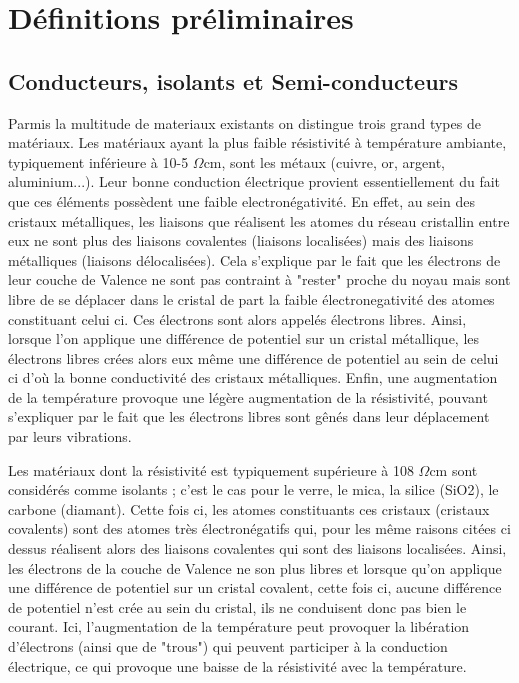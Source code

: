 \documentclass[10pt,a4paper]{report}
\begin{document}
\chapter{Définitions préliminaires}
\section{Conducteurs, isolants et Semi-conducteurs}
Parmis la multitude de materiaux existants  on distingue trois grand types de matériaux. 
Les  matériaux  ayant  la  plus  faible  résistivité  à  température  ambiante,  typiquement inférieure  à  10-5  $\Omega$cm,  sont  les  métaux  (cuivre,  or,  argent,  aluminium...). Leur bonne  conduction électrique provient essentiellement du fait que ces éléments possèdent une faible electronégativité. En effet, au sein des cristaux métalliques, les liaisons que réalisent les atomes du réseau cristallin entre eux ne sont plus des liaisons covalentes (liaisons localisées) mais des liaisons métalliques (liaisons délocalisées). Cela s'explique par le fait que les électrons de leur couche de Valence ne sont pas contraint à "rester" proche du noyau mais sont libre de se déplacer dans le cristal de part la faible électronegativité des atomes constituant celui ci. Ces électrons sont alors appelés électrons libres. Ainsi, lorsque l'on applique une différence de potentiel sur un cristal métallique, les électrons libres crées alors eux même une différence de potentiel au sein de celui ci d'où la bonne conductivité des cristaux métalliques. Enfin, une augmentation de  la 
température provoque une légère augmentation de la résistivité, pouvant s’expliquer par le fait que les électrons libres sont gênés dans leur déplacement par leurs vibrations.

 Les  matériaux  dont  la  résistivité  est  typiquement  supérieure  à  108  $\Omega$cm  sont  considérés comme isolants ; c’est le cas pour le verre, le mica, la silice (SiO2), le carbone (diamant). Cette fois ci, les atomes constituants ces cristaux (cristaux covalents) sont des atomes très électronégatifs qui, pour les même raisons citées ci dessus réalisent alors  des liaisons covalentes qui sont des liaisons localisées. Ainsi, les électrons de la couche de Valence ne son plus libres et lorsque qu'on applique une différence de potentiel sur un cristal covalent, cette fois ci, aucune différence de potentiel n'est crée au sein du cristal, ils ne conduisent donc pas bien le courant. Ici, l’augmentation  de  la  température  peut  provoquer  la  libération  d’électrons  (ainsi  que  de "trous")  qui  peuvent  participer  à  la  conduction  électrique,  ce  qui  provoque  une  baisse  de  la résistivité avec la température. 
\end{document}
